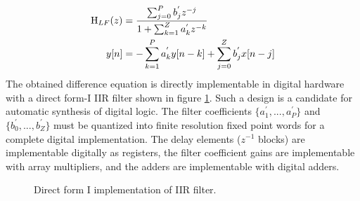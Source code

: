 			\begin{align}
				\textnormal{H}_{LF}(z) &= \frac{\sum_{j=0}^P b_j^{'}z^{-j}}{1+\sum_{k=1}^Z a_k^{'}z^{-k}}\label{eq:canonical_z_tf} \\
				y[n]&= -\sum_{k=1}^P a_k^{'}y[n-k] + \sum_{j=0}^Z b_j^{'}x[n-j] \label{eq:cananical_diff_eq}
			\end{align}
			The obtained difference equation is directly implementable in digital hardware with a direct form-I IIR filter \cite{proakis_1993} shown in figure \ref{fig:filt_implementation}. Such a design is a candidate for automatic synthesis of digital logic. The filter coefficients $\{a_1^{'}, ..., a_P^{'}\}$ and $\{b_0^{'}, ..., b_Z^{'}\}$ must be quantized into finite resolution fixed point words for a complete digital implementation. The delay elements ($z^{-1}$ blocks) are implementable digitally as registers, the filter coefficient gains are implementable with array multipliers, and the adders are implementable with digital adders.
			\begin{figure}[htb!]
				\center
				\caption{Direct form I implementation of IIR filter.}
				\label{fig:filt_implementation}
			\end{figure}


			
